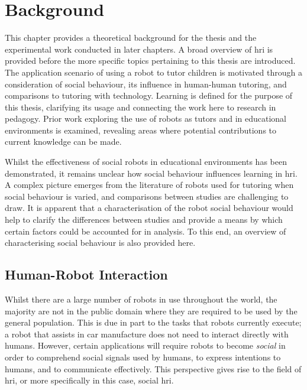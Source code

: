 \chapter{Background} \label{chap:background}
This chapter provides a theoretical background for the thesis and the experimental work conducted in later chapters. A broad overview of \acrshort{hri} is provided before the more specific topics pertaining to this thesis are introduced. The application scenario of using a robot to tutor children is motivated through a consideration of social behaviour, its influence in human-human tutoring, and comparisons to tutoring with technology. Learning is defined for the purpose of this thesis, clarifying its usage and connecting the work here to research in pedagogy. Prior work exploring the use of robots as tutors and in educational environments is examined, revealing areas where potential contributions to current knowledge can be made.

Whilst the effectiveness of social robots in educational environments has been demonstrated, it remains unclear how social behaviour influences learning in \acrshort{hri}. A complex picture emerges from the literature of robots used for tutoring when social behaviour is varied, and comparisons between studies are challenging to draw. It is apparent that a characterisation of the robot social behaviour would help to clarify the differences between studies and provide a means by which certain factors could be accounted for in analysis. To this end, an overview of characterising social behaviour is also provided here.

\section{Human-Robot Interaction}\label{sec:background-hri}
Whilst there are a large number of robots in use throughout the world, the majority are not in the public domain where they are required to be used by the general population. This is due in part to the tasks that robots currently execute; a robot that assists in car manufacture does not need to interact directly with humans. However, certain applications will require robots to become \textit{social} in order to comprehend social signals used by humans, to express intentions to humans, and to communicate effectively. This perspective gives rise to the field of \acrshort{hri}, or more specifically in this case, social \acrshort{hri}.

